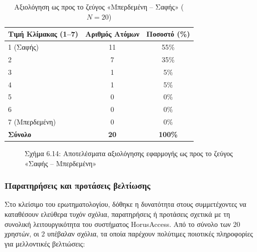 \documentclass[twoside, a4paper, 11pt]{article}
\newcommand{\textlatin}[1]{\textenglish{#1}}
\begin{document}
\begin{table}[H]
    \centering
    \caption{Αξιολόγηση ως προς το ζεύγος «Μπερδεμένη – Σαφής» ($N = 20$)}
    \begin{tabular}{|l|c|c|}
        \hline
        \textbf{Τιμή Κλίμακας (1–7)} & \textbf{Αριθμός Ατόμων} & \textbf{Ποσοστό (\%)} \\ \hline
        1 (Σαφής) & 11 & 55\% \\ \hline
        2 & 7 & 35\% \\ \hline
        3 & 1 & 5\% \\ \hline
        4 & 1 & 5\% \\ \hline
        5 & 0 & 0\% \\ \hline
        6 & 0 & 0\% \\ \hline
        7 (Μπερδεμένη) & 0 & 0\% \\ \hline
        \textbf{Σύνολο} & \textbf{20} & \textbf{100\%} \\ \hline
    \end{tabular}
\end{table}

\begin{figure}[H]
    \centering
    \caption{Σχήμα 6.14: Αποτελέσματα αξιολόγησης εφαρμογής ως προς το ζεύγος «Σαφής – Μπερδεμένη»}
\end{figure}

\subsubsection{Παρατηρήσεις και προτάσεις βελτίωσης}

Στο κλείσιμο του ερωτηματολογίου, δόθηκε η δυνατότητα στους συμμετέχοντες να καταθέσουν ελεύθερα τυχόν σχόλια, παρατηρήσεις ή προτάσεις σχετικά με τη συνολική λειτουργικότητα του συστήματος \textlatin{HorusAccess}. Από το σύνολο των $20$ χρηστών, οι $2$ υπέβαλαν σχόλια, τα οποία παρέχουν πολύτιμες ποιοτικές πληροφορίες για μελλοντικές βελτιώσεις:
\end{document}
